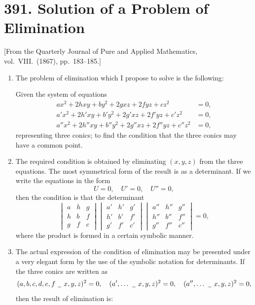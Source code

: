 \documentclass[12pt,a4paper]{article}
\theoremstyle{plain}
\theoremstyle{definition}
\theoremstyle{remark}
\begin{document}
\section*{391. Solution of a Problem of Elimination}

\begin{center}
\small [From the Quarterly Journal of Pure and Applied Mathematics, vol.~VIII.\ (1867), pp.~183--185.]
\end{center}

\begin{enumerate}[label=\arabic*.]
\item The problem of elimination which I propose to solve is the following:

Given the system of equations
\begin{align*}
ax^2 + 2hxy + by^2 + 2gxz + 2fyz + cz^2 &= 0, \\
a'x^2 + 2h'xy + b'y^2 + 2g'xz + 2f'yz + c'z^2 &= 0, \\
a''x^2 + 2h''xy + b''y^2 + 2g''xz + 2f''yz + c''z^2 &= 0,
\end{align*}
representing three conics; to find the condition that the three conics may have a common point.

\item The required condition is obtained by eliminating $(x,y,z)$ from the three equations. The most symmetrical form of the result is as a determinant. If we write the equations in the form
\[U = 0, \quad U' = 0, \quad U'' = 0,\]
then the condition is that the determinant
\[\begin{vmatrix}
a & h & g \\
h & b & f \\
g & f & c
\end{vmatrix}
\begin{vmatrix}
a' & h' & g' \\
h' & b' & f' \\
g' & f' & c'
\end{vmatrix}
\begin{vmatrix}
a'' & h'' & g'' \\
h'' & b'' & f'' \\
g'' & f'' & c''
\end{vmatrix} = 0,\]
where the product is formed in a certain symbolic manner.

\item The actual expression of the condition of elimination may be presented under a very elegant form by the use of the symbolic notation for determinants. If the three conics are written as
\[(a,b,c,d,e,f \,\raisebox{-0.5ex}{\,\texttildelow\,}\, x,y,z)^2 = 0, \quad (a',\ldots \,\raisebox{-0.5ex}{\,\texttildelow\,}\, x,y,z)^2 = 0, \quad (a'',\ldots \,\raisebox{-0.5ex}{\,\texttildelow\,}\, x,y,z)^2 = 0,\]
then the result of elimination is:


\end{enumerate}
\end{document}

